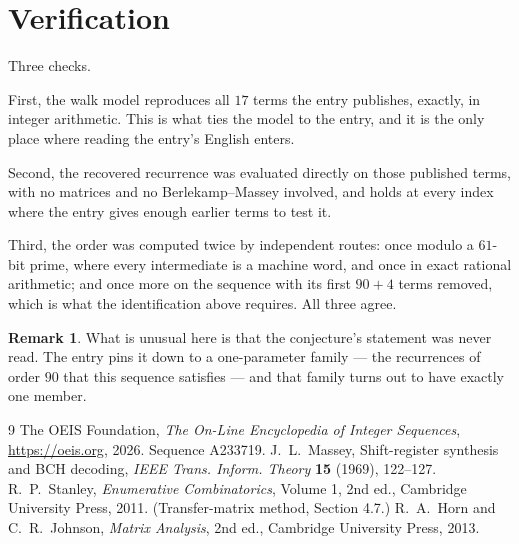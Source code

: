 \documentclass[11pt,a4paper]{article}
\theoremstyle{plain}
\theoremstyle{definition}
\newtheorem{remark}[theorem]{Remark}
\begin{document}
\section{Verification}

Three checks.

First, the walk model reproduces all $17$ terms the entry publishes, exactly, in integer
arithmetic. This is what ties the model to the entry, and it is the only place where reading
the entry's English enters.

Second, the recovered recurrence was evaluated directly on those published terms, with no
matrices and no Berlekamp--Massey involved, and holds at every index where the entry gives
enough earlier terms to test it.

Third, the order was computed twice by independent routes: once modulo a $61$-bit prime, where
every intermediate is a machine word, and once in exact rational arithmetic; and once more on
the sequence with its first $90+4$ terms removed, which is what the identification above
requires. All three agree.

\begin{remark}
What is unusual here is that the conjecture's statement was never read. The entry pins it down
to a one-parameter family --- the recurrences of order $90$ that this sequence satisfies
--- and that family turns out to have exactly one member.
\end{remark}

\begin{thebibliography}{9}
 The OEIS Foundation, \emph{The On-Line Encyclopedia of Integer
Sequences}, \url{https://oeis.org}, 2026. Sequence A233719.
 J.~L.~Massey, Shift-register synthesis and BCH decoding, \emph{IEEE
Trans. Inform. Theory} \textbf{15} (1969), 122--127.
 R.~P.~Stanley, \emph{Enumerative Combinatorics}, Volume 1, 2nd ed.,
Cambridge University Press, 2011. (Transfer-matrix method, Section 4.7.)
 R.~A.~Horn and C.~R.~Johnson, \emph{Matrix Analysis}, 2nd ed., Cambridge
University Press, 2013.
\end{thebibliography}
\end{document}
